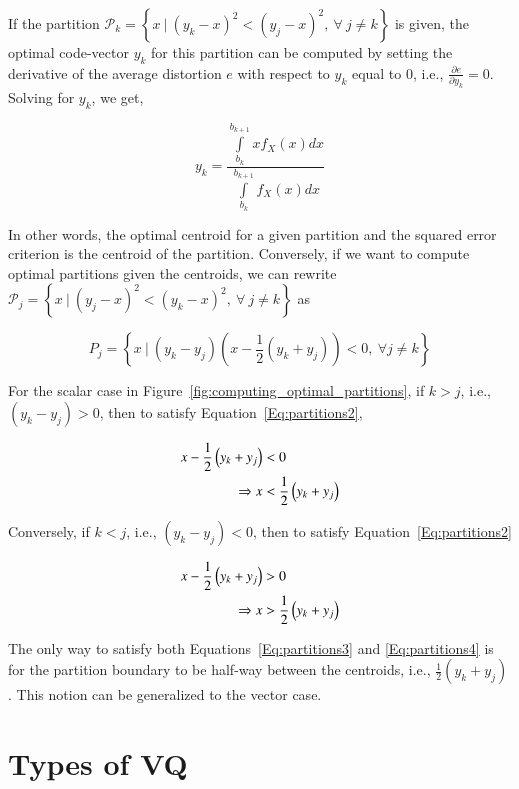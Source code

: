 \begin{Body}
If the partition $\mathcal{P}_k = \left\{x \ | \ (y_k-x)^2 < (y_j-x)^2, \ \forall \ j \neq k \right\}$ is given, the optimal code-vector $y_k$ for this partition can be computed by setting the derivative of the average distortion $e$ with respect to $y_k$ equal to 0, i.e., $\frac{\partial{e}}{\partial{y_k}} = 0$.  Solving for $y_k$, we get,

\begin{equation}
y_k = \frac
{\int\limits_{b_k}^{b_{k+1}}xf_X(x)dx}
{\int\limits_{b_k}^{b_{k+1}}f_X(x)dx}
\end{equation}

In other words, the optimal centroid for a given partition and the squared error criterion is the centroid of the partition.  Conversely, if we want to compute optimal partitions given the centroids, we can rewrite $\mathcal{P}_j= \left\{x \ | \ (y_j-x)^2 < (y_k-x)^2, \ \forall \ j \neq k \right\}$ as 

\begin{equation}
\label{Eq:partitions2}
P_j=\left\{x \ | \ (y_k -y_j) \left(x - \frac{1}{2} \left(y_k + y_j \right)\right) < 0, \ \forall j \neq k 
\right\}
\end{equation}

For the scalar case in Figure~\ref{fig:computing_optimal_partitions}, if $k>j$, i.e., $(y_k -y_j) > 0$, then to satisfy Equation~\ref{Eq:partitions2},

\begin{align}
\label{Eq:partitions3}
x - \frac{1}{2} \left(y_k + y_j \right) &< 0\notag\\
\Rightarrow x &< \frac{1}{2} \left(y_k + y_j \right)
\end{align}

Conversely, if $k<j$, i.e., $(y_k -y_j) < 0$, then to satisfy Equation~\ref{Eq:partitions2}

\begin{align}
\label{Eq:partitions4}
x - \frac{1}{2} \left(y_k + y_j \right) &> 0 \notag\\
\Rightarrow x &> \frac{1}{2} \left(y_k + y_j \right)
\end{align}

The only way to satisfy both Equations~\ref{Eq:partitions3} and \ref{Eq:partitions4} is for the partition boundary to be half-way between the centroids, i.e., $\frac{1}{2} \left(y_k + y_j \right)$.  This notion can be generalized to the vector case.

\section{Types of VQ}
\label{sec:types_VQ}


\end{Body}

